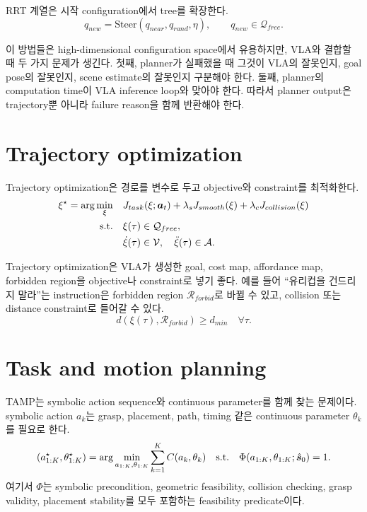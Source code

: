 RRT 계열은 시작 configuration에서 tree를 확장한다.
\begin{equation}
  q_{new}
  =
  \mathrm{Steer}(q_{near},q_{rand},\eta),
  \qquad
  q_{new}\in\mathcal{Q}_{free}.
  \label{eq:rrt-steer}
\end{equation}

이 방법들은 high-dimensional configuration space에서 유용하지만, VLA와 결합할 때 두 가지 문제가 생긴다. 첫째, planner가 실패했을 때 그것이 VLA의 잘못인지, goal pose의 잘못인지, scene estimate의 잘못인지 구분해야 한다. 둘째, planner의 computation time이 VLA inference loop와 맞아야 한다. 따라서 planner output은 trajectory뿐 아니라 failure reason을 함께 반환해야 한다.

\section{Trajectory optimization}

Trajectory optimization은 경로를 변수로 두고 objective와 constraint를 최적화한다.
\begin{equation}
\begin{aligned}
  \xi^\star
  =
  \arg\min_{\xi}
  &\quad
  J_{task}(\xi;\bm{a}_t)
  +\lambda_s J_{smooth}(\xi)
  +\lambda_c J_{collision}(\xi) \\
  \text{s.t.}
  &\quad
  \xi(\tau)\in\mathcal{Q}_{free},\\
  &\quad
  \dot{\xi}(\tau)\in\mathcal{V},\quad
  \ddot{\xi}(\tau)\in\mathcal{A}.
\end{aligned}
\label{eq:trajopt}
\end{equation}

Trajectory optimization은 VLA가 생성한 goal, cost map, affordance map, forbidden region을 objective나 constraint로 넣기 좋다. 예를 들어 ``유리컵을 건드리지 말라''는 instruction은 forbidden region $\mathcal{R}_{forbid}$로 바뀔 수 있고, collision 또는 distance constraint로 들어갈 수 있다.
\begin{equation}
  d(\xi(\tau),\mathcal{R}_{forbid}) \ge d_{min}
  \quad
  \forall \tau.
  \label{eq:forbidden-distance}
\end{equation}

\section{Task and motion planning}

TAMP는 symbolic action sequence와 continuous parameter를 함께 찾는 문제이다. symbolic action $a_k$는 grasp, placement, path, timing 같은 continuous parameter $\theta_k$를 필요로 한다.
\begin{equation}
  (a_{1:K}^{\star},\theta_{1:K}^{\star})
  =
  \arg\min_{a_{1:K},\theta_{1:K}}
  \sum_{k=1}^{K}
  C(a_k,\theta_k)
  \quad
  \text{s.t.}\quad
  \Phi(a_{1:K},\theta_{1:K};\hat{\bm{s}}_0)=1.
  \label{eq:tamp}
\end{equation}
여기서 $\Phi$는 symbolic precondition, geometric feasibility, collision checking, grasp validity, placement stability를 모두 포함하는 feasibility predicate이다.

